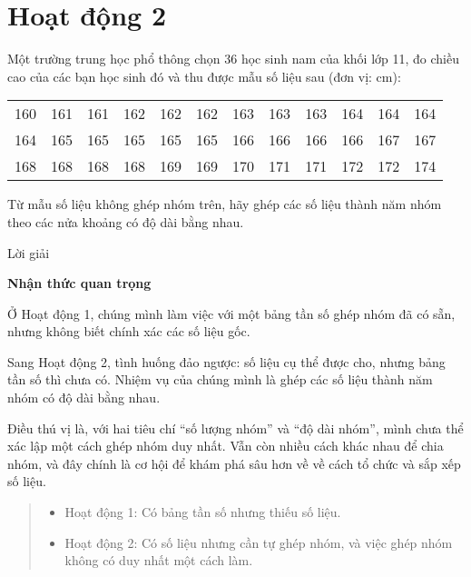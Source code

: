 \documentclass[
  letterpaper,
  DIV=11,
  numbers=noendperiod]{scrartcl}
\providecommand{\tightlist}{%
  \setlength{\itemsep}{0pt}\setlength{\parskip}{0pt}}\usepackage{longtable,booktabs,array}
\begin{document}
\section*{Hoạt động 2}

Một trường trung học phổ thông chọn 36 học sinh nam của khối lớp 11, đo
chiều cao của các bạn học sinh đó và thu được mẫu số liệu sau (đơn vị:
cm):

\begin{table}[!h]
\centering
\begin{tabular}{cccccccccccc}
\toprule
160 & 161 & 161 & 162 & 162 & 162 & 163 & 163 & 163 & 164 & 164 & 164\\
164 & 165 & 165 & 165 & 165 & 165 & 166 & 166 & 166 & 166 & 167 & 167\\
168 & 168 & 168 & 168 & 169 & 169 & 170 & 171 & 171 & 172 & 172 & 174\\
\bottomrule
\end{tabular}
\end{table}

Từ mẫu số liệu không ghép nhóm trên, hãy ghép các số liệu thành năm nhóm
theo các nửa khoảng có độ dài bằng nhau.

\begin{center}
Lời giải
\end{center}

\begin{tcolorbox}[enhanced jigsaw, opacityback=0, breakable, colback=white, left=2mm, rightrule=.15mm, leftrule=.75mm, arc=.35mm, colframe=quarto-callout-note-color-frame, bottomrule=.15mm, toprule=.15mm]

\vspace{-3mm}\textbf{Nhận thức quan trọng}\vspace{3mm}

Ở Hoạt động 1, chúng mình làm việc với một bảng tần số ghép nhóm đã có
sẵn, nhưng không biết chính xác các số liệu gốc.

Sang Hoạt động 2, tình huống đảo ngược: số liệu cụ thể được cho, nhưng
bảng tần số thì chưa có. Nhiệm vụ của chúng mình là ghép các số liệu
thành năm nhóm có độ dài bằng nhau.

Điều thú vị là, với hai tiêu chí ``số lượng nhóm'' và ``độ dài nhóm'',
mình chưa thể xác lập một cách ghép nhóm duy nhất. Vẫn còn nhiều cách
khác nhau để chia nhóm, và đây chính là cơ hội để khám phá sâu hơn về về
cách tổ chức và sắp xếp số liệu.

\begin{quote}
\begin{itemize}
\tightlist
\item
  Hoạt động 1: Có bảng tần số nhưng thiếu số liệu.
\item
  Hoạt động 2: Có số liệu nhưng cần tự ghép nhóm, và việc ghép nhóm
  không có duy nhất một cách làm.
\end{itemize}
\end{quote}

\end{tcolorbox}
\end{document}
